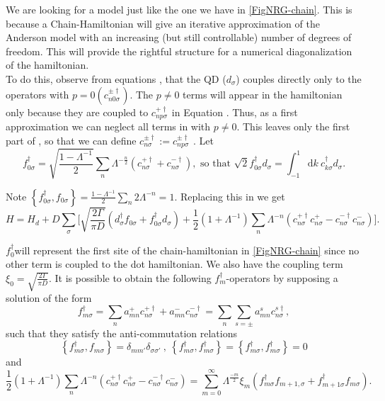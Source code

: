 We are looking for a model just like the one we have in \ref{FigNRG-chain}.
This is because a Chain-Hamiltonian will give an iterative approximation
of the Anderson model with an increasing (but still controllable)
number of degrees of freedom. This will provide the rightful structure
for a numerical diagonalization of the hamiltonian. \\

To do this, observe from equations ,
that the QD ($d_{\sigma}$) couples directly only to the operators
with $p=0$$\left(c_{n0\sigma}^{\pm\dagger}\right)$. The $p\neq0$
terms will appear in the hamiltonian only because they are coupled
to $c_{np\sigma}^{+\dagger}$ in Equation .
Thus, as a first approximation we can neglect all terms in 
with $p\neq0$. This leaves only the first part of ,
so that we can define $c_{n\sigma}^{\pm\dagger}:=c_{np\sigma}^{\pm\dagger}$
. Let 
\begin{equation}
f_{0\sigma}^{\dagger}=\sqrt{\frac{1-\Lambda^{-1}}{2}}\sum_{n}\Lambda^{-\frac{n}{2}}\left(c_{n\sigma}^{+\dagger}+c_{n\sigma}^{-\dagger}\right),\mbox{ so that }\sqrt{2}f_{0\sigma}^{\dagger}d_{\sigma}=\int_{-1}^{1}\mbox{d}k\ c_{k\sigma}^{\dagger}d_{\sigma}.\label{eq:f_0}
\end{equation}


Note $\left\{ f_{0\sigma}^{\dagger},f_{0\sigma}\right\} =\frac{1-\Lambda^{-1}}{2}\sum_{n}2\Lambda^{-n}=1$.
Replacing this in we get 
\[
H=H_{d}+D\sum_{\sigma}\Biggl[\sqrt{\frac{2\Gamma}{\pi D}}\left(d_{\sigma}^{\dagger}f_{0\sigma}+f_{0\sigma}^{\dagger}d_{\sigma}\right)+\frac{1}{2}\left(1+\Lambda^{-1}\right)\sum_{n}\Lambda^{-n}\left(c_{n\sigma}^{+\dagger}c_{n\sigma}^{+}-c_{n\sigma}^{-\dagger}c_{n\sigma}^{-}\right)\Biggr].
\]


$f_{0}^{\dagger}$will represent the first site of the chain-hamiltonian
in \ref{FigNRG-chain} since no other term is coupled to the dot hamiltonian.
We also have the coupling term $\xi_{0}=\sqrt{\frac{2\Gamma}{\pi D}}$.
It is possible to obtain the following $f_{m}^{\dagger}$-operators
by supposing a solution of the form 
\begin{equation}
f_{m\sigma}^{\dagger}=\sum_{n}a_{mn}^{+}c_{n\sigma}^{+\dagger}+a_{mn}^{-}c_{n\sigma}^{-\dagger}=\sum_{n}\sum_{s=\pm}a_{mn}^{s}c_{n\sigma}^{s\dagger},\label{eq:chain elements}
\end{equation}
 such that they satisfy the anti-commutation relations 
\[
\left\{ f_{m\sigma}^{\dagger},f_{m\sigma}\right\} =\delta_{mm'}\delta_{\sigma\sigma'}\ ,\ \left\{ f_{m\sigma}^{\dagger},f_{m\sigma}^{\dagger}\right\} =\left\{ f_{m\sigma}^{\dagger},f_{m\sigma}^{\dagger}\right\} =0
\]
and 
\begin{equation}
\frac{1}{2}\left(1+\Lambda^{-1}\right)\sum_{n}\Lambda^{-n}\left(c_{n\sigma}^{+\dagger}c_{n\sigma}^{+}-c_{n\sigma}^{-\dagger}c_{n\sigma}^{-}\right)=\sum_{m=0}^{\infty}\Lambda^{\frac{-m}{2}}\xi_{m}\left(f_{m\sigma}^{\dagger}f_{m+1,\sigma}+f_{m+1\sigma}^{\dagger}f_{m\sigma}\right).\label{eq:final equation}
\end{equation}


